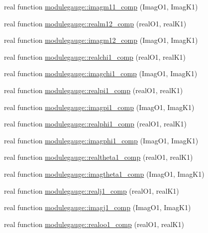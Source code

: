 \begin{DoxyCompactItemize}
\item 
real function \mbox{\hyperlink{namespacemodulegauge_a7beaca7c4aa86b03edc166fe413a4f48}{modulegauge\+::imagm11\+\_\+comp}} (Imag\+O1, Imag\+K1)
\item 
real function \mbox{\hyperlink{namespacemodulegauge_ae46da4813d3e3f271dc78267bee39db6}{modulegauge\+::realm12\+\_\+comp}} (real\+O1, real\+K1)
\item 
real function \mbox{\hyperlink{namespacemodulegauge_aa6945b552551befe5db497d61883c814}{modulegauge\+::imagm12\+\_\+comp}} (Imag\+O1, Imag\+K1)
\item 
real function \mbox{\hyperlink{namespacemodulegauge_ab5f77ac1ee7d3ccaa97fe4e99a711bdb}{modulegauge\+::realchi1\+\_\+comp}} (real\+O1, real\+K1)
\item 
real function \mbox{\hyperlink{namespacemodulegauge_a681cb9c3664a268964c3c3d9e1aaccfd}{modulegauge\+::imagchi1\+\_\+comp}} (Imag\+O1, Imag\+K1)
\item 
real function \mbox{\hyperlink{namespacemodulegauge_a09dbdb08ae03c360a014f9a99d18930d}{modulegauge\+::realpi1\+\_\+comp}} (real\+O1, real\+K1)
\item 
real function \mbox{\hyperlink{namespacemodulegauge_a71b5d5333c564a3344645bef85a9e75b}{modulegauge\+::imagpi1\+\_\+comp}} (Imag\+O1, Imag\+K1)
\item 
real function \mbox{\hyperlink{namespacemodulegauge_aa6ea15f43448899f9b29ff0b1dfc29db}{modulegauge\+::realphi1\+\_\+comp}} (real\+O1, real\+K1)
\item 
real function \mbox{\hyperlink{namespacemodulegauge_a0d65a34744a9e60a2568d7e627a69831}{modulegauge\+::imagphi1\+\_\+comp}} (Imag\+O1, Imag\+K1)
\item 
real function \mbox{\hyperlink{namespacemodulegauge_ad2e8899353e8c890c82e852038be05f9}{modulegauge\+::realtheta1\+\_\+comp}} (real\+O1, real\+K1)
\item 
real function \mbox{\hyperlink{namespacemodulegauge_a2e204b866f8da90453f9d7af3fd23ec6}{modulegauge\+::imagtheta1\+\_\+comp}} (Imag\+O1, Imag\+K1)
\item 
real function \mbox{\hyperlink{namespacemodulegauge_a48b5405cff2ce5a1d7821cc09cd69260}{modulegauge\+::realj1\+\_\+comp}} (real\+O1, real\+K1)
\item 
real function \mbox{\hyperlink{namespacemodulegauge_af198ff90d25c103ae0c6ea8dc688ac4f}{modulegauge\+::imagj1\+\_\+comp}} (Imag\+O1, Imag\+K1)
\item 
real function \mbox{\hyperlink{namespacemodulegauge_a993e1ea45365954809031bb57945219b}{modulegauge\+::realoo1\+\_\+comp}} (real\+O1, real\+K1)

\end{DoxyCompactItemize}

